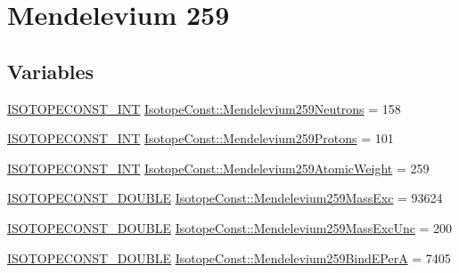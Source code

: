 \hypertarget{group___isotope_const-_mendelevium-_md259}{}\section{Mendelevium 259}
\label{group___isotope_const-_mendelevium-_md259}
\subsection*{Variables}
\begin{DoxyCompactItemize}
\item 
\mbox{\hyperlink{group___isotope_const-_macros_ga5f18360b3e99483a35c32d789e62621c}{I\+S\+O\+T\+O\+P\+E\+C\+O\+N\+S\+T\+\_\+\+I\+NT}} \mbox{\hyperlink{group___isotope_const-_mendelevium-_md259_ga16c987b5fd7914543766ed546d486164}{Isotope\+Const\+::\+Mendelevium259\+Neutrons}} = 158
\item 
\mbox{\hyperlink{group___isotope_const-_macros_ga5f18360b3e99483a35c32d789e62621c}{I\+S\+O\+T\+O\+P\+E\+C\+O\+N\+S\+T\+\_\+\+I\+NT}} \mbox{\hyperlink{group___isotope_const-_mendelevium-_md259_ga559c07bd0ef7273c773a5ad9574dce0b}{Isotope\+Const\+::\+Mendelevium259\+Protons}} = 101
\item 
\mbox{\hyperlink{group___isotope_const-_macros_ga5f18360b3e99483a35c32d789e62621c}{I\+S\+O\+T\+O\+P\+E\+C\+O\+N\+S\+T\+\_\+\+I\+NT}} \mbox{\hyperlink{group___isotope_const-_mendelevium-_md259_gaa56e48a7998ad1db51d8b112eb407063}{Isotope\+Const\+::\+Mendelevium259\+Atomic\+Weight}} = 259
\item 
\mbox{\hyperlink{group___isotope_const-_macros_ga8f45a7272ce02c0b4c65c44636ed719a}{I\+S\+O\+T\+O\+P\+E\+C\+O\+N\+S\+T\+\_\+\+D\+O\+U\+B\+LE}} \mbox{\hyperlink{group___isotope_const-_mendelevium-_md259_ga340589f9d3e214319e43f64d32fa1cf9}{Isotope\+Const\+::\+Mendelevium259\+Mass\+Exc}} = 93624
\item 
\mbox{\hyperlink{group___isotope_const-_macros_ga8f45a7272ce02c0b4c65c44636ed719a}{I\+S\+O\+T\+O\+P\+E\+C\+O\+N\+S\+T\+\_\+\+D\+O\+U\+B\+LE}} \mbox{\hyperlink{group___isotope_const-_mendelevium-_md259_ga17acdc865a055e6cb41aa4e1a0b412d7}{Isotope\+Const\+::\+Mendelevium259\+Mass\+Exc\+Unc}} = 200
\item 
\mbox{\hyperlink{group___isotope_const-_macros_ga8f45a7272ce02c0b4c65c44636ed719a}{I\+S\+O\+T\+O\+P\+E\+C\+O\+N\+S\+T\+\_\+\+D\+O\+U\+B\+LE}} \mbox{\hyperlink{group___isotope_const-_mendelevium-_md259_gaf2dd868cde904e54e40e0b282589e81a}{Isotope\+Const\+::\+Mendelevium259\+Bind\+E\+PerA}} = 7405

\end{DoxyCompactItemize}

